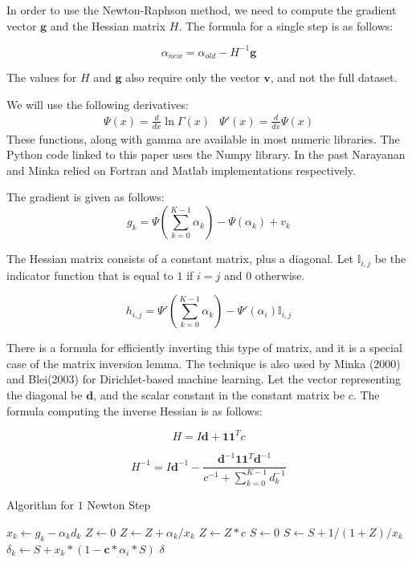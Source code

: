 \documentclass[twoside]{article}
\begin{document}
In order to use the Newton-Raphson method, we need to compute the gradient vector $\mathbf{g}$ and the Hessian matrix $H$.  The formula for a single step is as follows:

\[\alpha_{new}=\alpha_{old}-H^{-1}\mathbf{g}\]

The values for $H$ and $\mathbf{g}$ also require only the vector $\mathbf{v}$, and not the full dataset.

We will use the following derivatives:
\[
\begin{array}{cc} \Psi(x) = \frac{d}{dx} \ln\Gamma(x) & \Psi'(x) = \frac{d}{dx} \Psi(x)
\end{array}
\]
These functions, along with gamma are available in most numeric libraries.  The Python code linked to this paper uses the Numpy library.  In the past Narayanan\cite{narayanan} and Minka\cite{minka} relied on Fortran and Matlab implementations respectively.

The gradient is given as follows:
\[
g_k=\Psi(\sum_{k=0}^{K-1}\alpha_k)-\Psi(\alpha_k)+v_k
\]

The Hessian matrix consists of a constant matrix, plus a diagonal.  Let $\mathbb{I}_{i,j}$ be the indicator function that is equal to $1$ if $i = j$ and $0$ otherwise.

\[
h_{i,j}=\Psi'(\sum_{k=0}^{K-1}\alpha_k)-\Psi'(\alpha_i)\mathbb{I}_{i,j}
\]

There is a formula for efficiently inverting this type of matrix, and it is a special case of the matrix inversion lemma\cite{woodbury}.  The technique is also used by Minka\cite{minka} (2000) and Blei\cite[A.2]{blei}(2003) for Dirichlet-based machine learning.  Let the vector representing the diagonal be $\mathbf{d}$, and the scalar constant in the constant matrix be $c$.  The formula computing the inverse Hessian is as follows:

\[
H=I\mathbf{d} + \mathbf{1}\mathbf{1}^Tc
\]

\begin{equation}
H^{-1}=I\mathbf{d}^{-1}-\frac{\mathbf{d}^{-1}\mathbf{1}\mathbf{1}^T\mathbf{d}^{-1}}{c^{-1}+\sum_{k=0}^{K-1}d_k^{-1}}
\label{eq:invert_hessian}
\end{equation}

\begin{algorithm}
  \caption{Algorithm for $1$ Newton Step}
  \begin{algorithmic}
  \State $x_k \leftarrow g_k-\alpha_kd_k$
  \State $Z \leftarrow 0$
    \State $Z \leftarrow Z + \alpha_k / x_k$ \EndFor
  \State $Z \leftarrow Z*c$
  \State $S \leftarrow 0$
    \State $S \leftarrow S + 1/(1+Z)/x_k$ \EndFor
    \State $\delta_k \leftarrow S + x_k*(1-\mathbf{c}*\alpha_i*S)$ \EndFor
  \State \Return $\delta$
  \EndFunction
  \end{algorithmic}
  \label{alg:step}
\end{algorithm}
\end{document}
